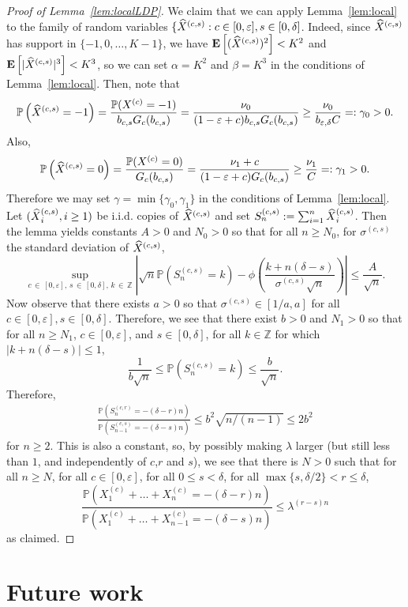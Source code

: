 \documentclass[AHL,Unicode,longabstracts,published]{cedram}
\newcommand{\Z}{\mathbb{Z}}
\renewcommand{\P}{\mathbb{P}}
\newcommand{\E}[1]{{\mathbf E}\left[#1\right]}
\let\oldhat\hat
\renewcommand*{\hat}[1]{\mathchoice{\widehat{#1}}{\widehat{#1}}{\oldhat{#1}}{\oldhat{#1}}}
\begin{document}
\begin{proof}[Proof of Lemma~\ref{lem:localLDP}]
We claim that we can apply Lemma~\ref{lem:local} to the family of random variables $\{\hat{X}^{(c,s)}:c\in [0,\varepsilon], s\in [0,\delta]$. Indeed, since $\hat{X}^{(c,s)}$ has support in $\{-1,0,\dots, K-1\}$, we have $\E{(\hat{X}^{(c,s)})^2}<K^2$ and $\E{|\hat{X}^{(c,s)}|^3}<K^3$, so we can set $\alpha=K^2$ and $\beta=K^3$ in the conditions of Lemma~\ref{lem:local}. Then, note that
\[
\P\left(\hat{X}^{(c,s)}=-1\right)=\frac{\P(X^{(c)}=-1)}{b_{c,s}G_c(b_{c,s})}=\frac{\nu_0}{ (1-\varepsilon+c)b_{c,s}G_c(b_{c,s})}\geq \frac{\nu_0}{ b_{\varepsilon,\delta} C}=:\gamma_0>0.
\]
Also,
\[
\P\left(\hat{X}^{(c,s)}=0\right)=\frac{\P(X^{(c)}=0)}{G_c(b_{c,s})}=\frac{\nu_1+c}{ (1-\varepsilon+c)G_c(b_{c,s}) }\geq \frac{\nu_1}{C}=:\gamma_1>0.
\]
Therefore we may set $\gamma=\min\{\gamma_0,\gamma_1\}$ in the conditions of Lemma~\ref{lem:local}. Let $(\hat{X}^{(c,s)}_i,i\linebreak \ge 1)$ be i.i.d. copies of $\hat{X}^{(c,s)}$ and set $S^{(c,s)}_n:=\sum_{i=1}^n \hat{X}^{(c,s)}_i$. Then the lemma yields constants $A>0$ and $N_0>0$ so that for all $n\geq N_0$, for $\sigma^{(c,s)}$ the standard deviation of $\hat{X}^{(c,s)}$,
\[
\sup_{c\,\in\,[0,\varepsilon],\,s\,\in\,[0,\delta], \,k\,\in\,\Z} \left|\sqrt{n}\P\left(S^{(c,s)}_n=k\right)-\phi\left(\frac{k+n(\delta-s)}{\sigma^{(c,s)}\sqrt{n}}\right) \right|\leq \frac{A}{\sqrt{n}}.
\]
Now observe that there exists $a>0$ so that $\sigma^{(c,s)}\in [1/a,a]$ for all $c\in [0,\varepsilon], s\in[0,\delta]$. Therefore, we see that there exist $b>0$ and $N_1>0$ so that for all $n\ge N_1$, $c\in [0,\varepsilon]$, and $s\in[0,\delta]$, for all $k\in \Z$ for which $|k+n(\delta-s)|\le 1 $,
\[
\frac{1}{b\sqrt n} \leq \P\left(S^{(c,s)}_n=k\right)\leq \frac{b}{\sqrt{n}}.
\]
Therefore,
\begin{align*}
\frac{\P\left(S^{(c,r)}_n=-(\delta-r)n\right)}{ \P\left(S^{(c,s)}_{n-1}=-(\delta-s)n\right)}\leq b^2\sqrt{n/(n-1)}\leq 2b^2
\end{align*}
for $n\geq 2$. This is also a constant, so, by possibly making $\lambda$ larger (but still less than $1$, and independently of $c$,$r$ and $s$), we see that there is $N>0$ such that for all $n \ge N$, for all $c\in [0,\varepsilon]$, for all $0\leq s<\delta$, for all $\max\{s,\delta/2\}<r\leq \delta$,
\[
\frac{\P\left(X^{(c)}_1+\dots+X^{(c)}_{n}= -(\delta-r)n\right)}{
\P\left(X^{(c)}_1+\dots+X^{(c)}_{n-1}=-(\delta-s)n\right)}\leq \lambda^{(r-s)n}
\]
as claimed.
\end{proof}


\section{Future work}\label{sec:future}
\end{document}
